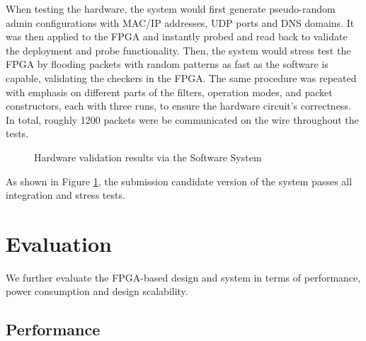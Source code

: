 \documentclass[a4paper]{report}
\begin{document}
When testing the hardware, the system would first generate pseudo-random admin configurations with MAC/IP addresses, UDP ports and DNS domains. It was then applied to the FPGA and instantly probed and read back to validate the deployment and probe functionality. Then, the system would stress test the FPGA by flooding packets with random patterns as fast as the software is capable, validating the checkers in the FPGA. The same procedure was repeated with emphasis on different parts of the filters, operation modes, and packet constructors, each with three runs, to ensure the hardware circuit's correctness. In total, roughly 1200 packets were be communicated on the wire throughout the tests. 

\begin{figure}[H]
  \caption{Hardware validation results via the Software System}
  \label{fig:hardware-validation-results}
\end{figure}

As shown in Figure \ref{fig:hardware-validation-results}, the submission candidate version of the system passes all integration and stress tests.

\section{Evaluation}

We further evaluate the FPGA-based design and system in terms of performance, power consumption and design scalability.

\subsection{Performance}
\end{document}
